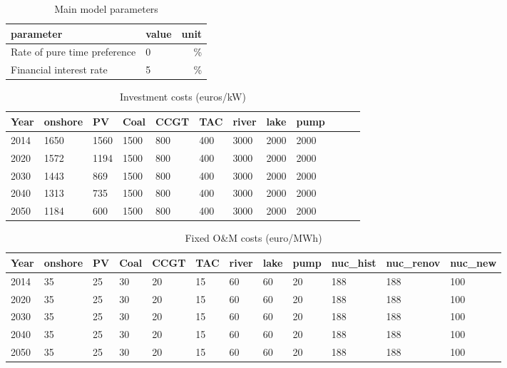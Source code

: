 \begin{table}[!ht]
	\centering
	\caption{Main model parameters}
	\begin{tabular}{llr}
		\toprule
		parameter&value&unit\\
		\midrule
		Rate of pure time preference &0&\%\\
		Financial interest rate&5&\%\\
		\bottomrule
	\end{tabular}
\end{table}

\begin{table}[!ht]
	\centering
	\caption{Investment costs (euros/kW)}
	\label{tab:Investment _costs}
	\begin{adjustbox}{width=1\textwidth}
	\small
	\begin{tabular}{llllllllllll}
		\toprule
		 Year & onshore & PV & Coal & CCGT & TAC & river & lake & pump  \\
		\midrule
		2014 & 1650 & 1560 & 1500 & 800 & 400 & 3000 & 2000 & 2000  \\
		2020 & 1572 & 1194 & 1500 & 800 & 400 & 3000 & 2000 & 2000 \\
		2030 & 1443 & 869 & 1500 & 800 & 400 & 3000 & 2000 & 2000  \\
		2040 & 1313 & 735 & 1500 & 800 & 400 & 3000 & 2000 & 2000 \\
		2050 & 1184 & 600 & 1500 & 800 & 400 & 3000 & 2000 & 2000 \\
		\bottomrule
	\end{tabular}
\end{adjustbox}
\end{table}

\begin{table}[!ht]
	\centering
	\caption{Fixed O\&M costs (euro/MWh)}
	\label{tab:OM_costs}
		\begin{adjustbox}{width=1\textwidth}
	\small
	\begin{tabular}{llllllllllll}
		\toprule
		Year & onshore & PV & Coal & CCGT & TAC & river & lake & pump & nuc\_hist & nuc\_renov & nuc\_new \\
		\midrule
		2014 & 35 & 25 & 30 & 20 & 15 & 60 & 60 & 20 & 188 & 188 & 100 \\
		2020 & 35 & 25 & 30 & 20 & 15 & 60 & 60 & 20 & 188 & 188 & 100 \\
		2030 & 35 & 25 & 30 & 20 & 15 & 60 & 60 & 20 & 188 & 188 & 100 \\
		2040 & 35 & 25 & 30 & 20 & 15 & 60 & 60 & 20 & 188 & 188 & 100 \\
		2050 & 35 & 25 & 30 & 20 & 15 & 60 & 60 & 20 & 188 & 188 & 100 \\
		\bottomrule
	\end{tabular}
\end{adjustbox}
\end{table}


